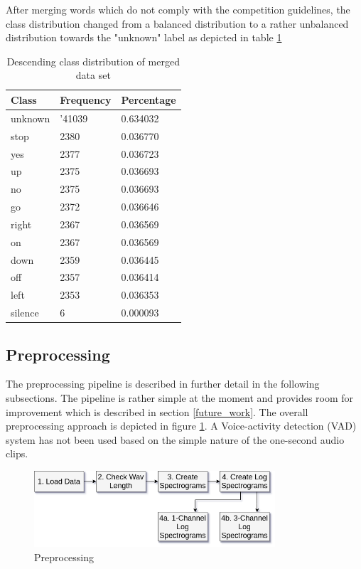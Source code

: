 \documentclass{article}
\theoremstyle{definition}
\theoremstyle{remark}
\begin{document}
After merging words which do not comply with the competition guidelines, the class distribution changed from a balanced distribution to a rather unbalanced distribution towards the "unknown" label as depicted in table \ref{tab:class_distribution}


\begin{table}[h!]
\center
\begin{tabular}{|l|l|l|}
\hline
Class & Frequency & Percentage \\ \hline
unknown & '41039 & 0.634032  \\ \hline
stop & 2380 & 0.036770 \\ \hline
yes & 2377 & 0.036723  \\ \hline
up & 2375 &  0.036693\\ \hline
no & 2375 & 0.036693 \\ \hline
go & 2372 & 0.036646 \\ \hline
right & 2367 & 0.036569 \\ \hline
on & 2367 & 0.036569 \\ \hline
down & 2359 & 0.036445 \\ \hline
off & 2357 & 0.036414 \\ \hline
left & 2353 & 0.036353\\ \hline
silence & 6 & 0.000093\\ \hline
\end{tabular}
\caption{Descending class distribution of merged data set}
\label{tab:class_distribution}
\end{table}

		
		
		
		
		
		
		
		
		
		
		

\subsection{Preprocessing}

The preprocessing pipeline is described in further detail in the following subsections. The pipeline is rather simple at the moment and provides room for improvement which is described in section \ref{future_work}. The overall preprocessing approach is depicted in figure \ref{fig:preprocessing}. A Voice-activity detection (VAD) system 
has not been used based on the simple nature of the one-second audio clips.

\begin{figure}[h]
    \centering
    \includegraphics[width=0.8\textwidth]{img/preprocessing.png}
    \caption{Preprocessing}
    \label{fig:preprocessing}
\end{figure}
\end{document}
